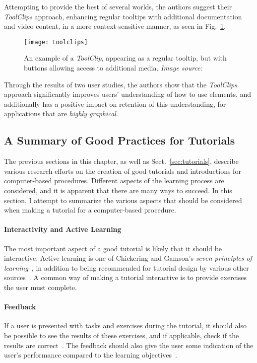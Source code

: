 \noindent
Attempting to provide the best of several worlds, the authors suggest their \emph{ToolClips} approach, enhancing regular tooltips with additional documentation and video content, in a more context-sensitive manner, as seen in Fig.~\ref{fig:toolclips}.

\begin{figure}[htp]
	\centering
	\texttt{[image: toolclips]}
	\caption[\emph{ToolClips} example]{An example of a \emph{ToolClip}, appearing as a regular tooltip, but with buttons allowing access to additional media. \emph{Image source:~\cite{grossman:toolclips}}}
	\label{fig:toolclips}
\end{figure}

\noindent
Through the results of two user studies, the authors show that the \emph{ToolClips} approach significantly improves users' understanding of how to use elements, and additionally has a positive impact on retention of this understanding, for applications that are \emph{highly graphical}.

\subsection{A Summary of Good Practices for Tutorials}
\label{sec:good_practices_tutorials}
The previous sections in this chapter, as well as Sect.~\ref{sec:tutorials}, describe various research efforts on the creation of good tutorials and introductions for computer-based procedures. Different aspects of the learning process are considered, and it is apparent that there are many ways to succeed. In this section, I attempt to summarize the various aspects that should be considered when making a tutorial for a computer-based procedure.

\paragraph{Interactivity and Active Learning} The most important aspect of a good tutorial is likely that it should be interactive. Active learning is one of Chickering and Gamson's \emph{seven principles of learning}~\cite{chickering:seven_principles}, in addition to being recommended for tutorial design by various other sources~\cite{bowerman:tutorial_design, aberson:tutorial_evaluation}. A common way of making a tutorial interactive is to provide exercises the user must complete.

\paragraph{Feedback} If a user is presented with tasks and exercises during the tutorial, it should also be possible to see the results of these exercises, and if applicable, check if the results are correct~\cite{chickering:seven_principles}. The feedback should also give the user some indication of the user's performance compared to the learning objectives~\cite{bowerman:tutorial_design}.

